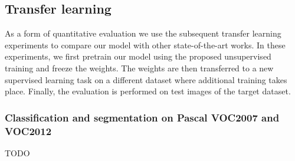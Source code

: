 \documentclass[12pt,a4paper]{article}
\begin{document}




\subsection{Transfer learning} %
As a form of quantitative evaluation we use the subsequent transfer learning experiments to compare our model with other state-of-the-art works. In these experiments, we first pretrain our model using the proposed unsupervised training and freeze the weights. The weights are then transferred to a new supervised learning task on a different dataset where additional training takes place. Finally, the evaluation is performed on test images of the target dataset.

\subsubsection{Classification and segmentation on Pascal VOC2007 and VOC2012}\label{subsec:tl_exp_pascalvoc}
TODO
\end{document}
